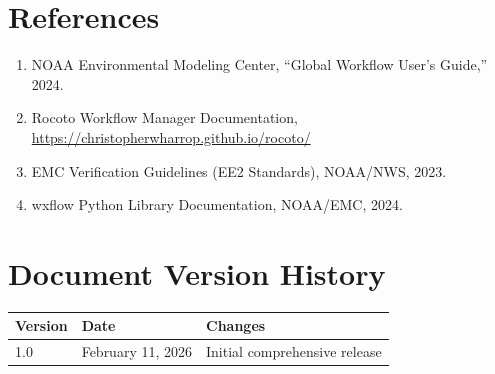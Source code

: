\documentclass[11pt,letterpaper]{article}
\begin{document}

\section*{References}

\begin{enumerate}
    \item NOAA Environmental Modeling Center, ``Global Workflow User's Guide,'' 2024.
    \item Rocoto Workflow Manager Documentation, \url{https://christopherwharrop.github.io/rocoto/}
    \item EMC Verification Guidelines (EE2 Standards), NOAA/NWS, 2023.
    \item wxflow Python Library Documentation, NOAA/EMC, 2024.
\end{enumerate}


\section*{Document Version History}

\begin{table}[H]
\centering
\begin{tabular}{@{}llp{7cm}@{}}
\toprule
\textbf{Version} & \textbf{Date} & \textbf{Changes} \\
\midrule
1.0 & February 11, 2026 & Initial comprehensive release \\
\bottomrule
\end{tabular}
\end{table}
\end{document}
